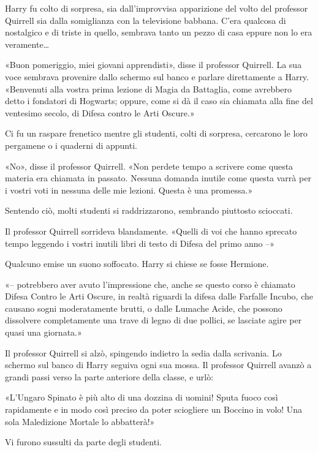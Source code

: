 Harry fu colto di sorpresa, sia dall’improvvisa apparizione del volto del professor Quirrell sia dalla somiglianza con la televisione babbana. C’era qualcosa di nostalgico e di triste in quello, sembrava tanto un pezzo di casa eppure non lo era veramente…

«Buon pomeriggio, miei giovani apprendisti», disse il professor Quirrell. La sua voce sembrava provenire dallo schermo sul banco e parlare direttamente a Harry. «Benvenuti alla vostra prima lezione di Magia da Battaglia, come avrebbero detto i fondatori di Hogwarts; oppure, come si dà il caso sia chiamata alla fine del ventesimo secolo, di Difesa contro le Arti Oscure.»

Ci fu un raspare frenetico mentre gli studenti, colti di sorpresa, cercarono le loro pergamene o i quaderni di appunti.

«No», disse il professor Quirrell. «Non perdete tempo a scrivere come questa materia era chiamata in passato. Nessuna domanda inutile come questa varrà per i vostri voti in nessuna delle mie lezioni. Questa è una promessa.»

Sentendo ciò, molti studenti si raddrizzarono, sembrando piuttosto scioccati.

Il professor Quirrell sorrideva blandamente. «Quelli di voi che hanno sprecato tempo leggendo i vostri inutili libri di testo di Difesa del primo anno –»

Qualcuno emise un suono soffocato. Harry si chiese se fosse Hermione.

«– potrebbero aver avuto l’impressione che, anche se questo corso è chiamato Difesa Contro le Arti Oscure, in realtà riguardi la difesa dalle Farfalle Incubo, che causano sogni moderatamente brutti, o dalle Lumache Acide, che possono dissolvere completamente una trave di legno di due pollici, se lasciate agire per quasi una giornata.»

Il professor Quirrell si alzò, spingendo indietro la sedia dalla scrivania. Lo schermo sul banco di Harry seguiva ogni sua mossa. Il professor Quirrell avanzò a grandi passi verso la parte anteriore della classe, e urlò:

«L’Ungaro Spinato è più alto di una dozzina di uomini! Sputa fuoco così rapidamente e in modo così preciso da poter sciogliere un Boccino in volo! Una sola Maledizione Mortale lo abbatterà!»

Vi furono sussulti da parte degli studenti.

